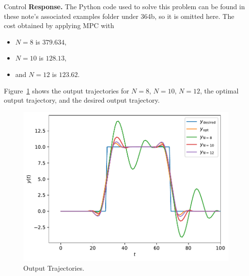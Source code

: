 \begin{chapter}{Control}
    \vspace{.1cm} 
    \noindent \textbf{Response.} The Python code used to solve this problem can be found in these note's associated examples folder under 364b,
    so it is omitted here. The cost obtained by applying MPC with 
    \begin{itemize}
        \item $N = 8$ is $379.634$,
        \item $N = 10$ is $128.13$,
        \item and $N=12$ is $123.62$.
    \end{itemize}
    Figure~\ref{fig:364-hw7-traj-out} shows the output trajectories for $N=8$, $N=10$, $N=12$,
    the optimal output trajectory, and the desired output trajectory.

    \begin{figure}[h]
        \centering
        \includegraphics[width=\linewidth]{examples/364b/364b_mpc_output.pdf}
        \caption{Output Trajectories.}
        \label{fig:364-hw7-traj-out}
    \end{figure}
    
\end{chapter}